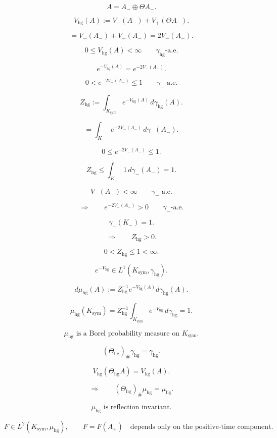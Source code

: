 \documentclass[11pt]{article}
\begin{document}
\[
A=A_-\oplus\Theta A_-.
\]

\[
V_{\mathrm{hg}}(A)
:=
V_-(A_-)+V_+(\Theta A_-).
\]

\[
=
V_-(A_-)+V_-(A_-)
=
2V_-(A_-).
\]

\[
0\le V_{\mathrm{hg}}(A)<\infty
\qquad
\gamma_{\mathrm{hg}}\text{-a.e.}
\]

\[
e^{-V_{\mathrm{hg}}(A)}
=
e^{-2V_-(A_-)}.
\]

\[
0<e^{-2V_-(A_-)}\le1
\qquad
\gamma_-\text{-a.e.}
\]

\[
Z_{\mathrm{hg}}
:=
\int_{K_{\mathrm{sym}}}e^{-V_{\mathrm{hg}}(A)}\,d\gamma_{\mathrm{hg}}(A).
\]

\[
=
\int_{K_-}e^{-2V_-(A_-)}\,d\gamma_-(A_-).
\]

\[
0\le e^{-2V_-(A_-)}\le1.
\]

\[
Z_{\mathrm{hg}}
\le
\int_{K_-}1\,d\gamma_-(A_-)
=
1.
\]

\[
V_-(A_-)<\infty
\qquad
\gamma_-\text{-a.e.}
\]

\[
\Longrightarrow
\qquad
e^{-2V_-(A_-)}>0
\qquad
\gamma_-\text{-a.e.}
\]

\[
\gamma_-(K_-)=1.
\]

\[
\Longrightarrow
\qquad
Z_{\mathrm{hg}}>0.
\]

\[
\boxed{
0<Z_{\mathrm{hg}}\le1<\infty.
}
\]

\[
\boxed{
e^{-V_{\mathrm{hg}}}\in L^1(K_{\mathrm{sym}},\gamma_{\mathrm{hg}}).
}
\]

\[
d\mu_{\mathrm{hg}}(A)
:=
Z_{\mathrm{hg}}^{-1}
e^{-V_{\mathrm{hg}}(A)}
d\gamma_{\mathrm{hg}}(A).
\]

\[
\mu_{\mathrm{hg}}(K_{\mathrm{sym}})
=
Z_{\mathrm{hg}}^{-1}
\int_{K_{\mathrm{sym}}}e^{-V_{\mathrm{hg}}}\,d\gamma_{\mathrm{hg}}
=
1.
\]

\[
\boxed{
\mu_{\mathrm{hg}}
\text{ is a Borel probability measure on }K_{\mathrm{sym}}.
}
\]

\[
(\Theta_{\mathrm{hg}})_\#\gamma_{\mathrm{hg}}=\gamma_{\mathrm{hg}}.
\]

\[
V_{\mathrm{hg}}(\Theta_{\mathrm{hg}}A)
=
V_{\mathrm{hg}}(A).
\]

\[
\Longrightarrow
\qquad
(\Theta_{\mathrm{hg}})_\#\mu_{\mathrm{hg}}
=
\mu_{\mathrm{hg}}.
\]

\[
\boxed{
\mu_{\mathrm{hg}}
\text{ is reflection invariant.}
}
\]

\[
F\in L^2(K_{\mathrm{sym}},\mu_{\mathrm{hg}}),
\qquad
F=F(A_+)
\quad
\text{depends only on the positive-time component}.
\]
\end{document}
